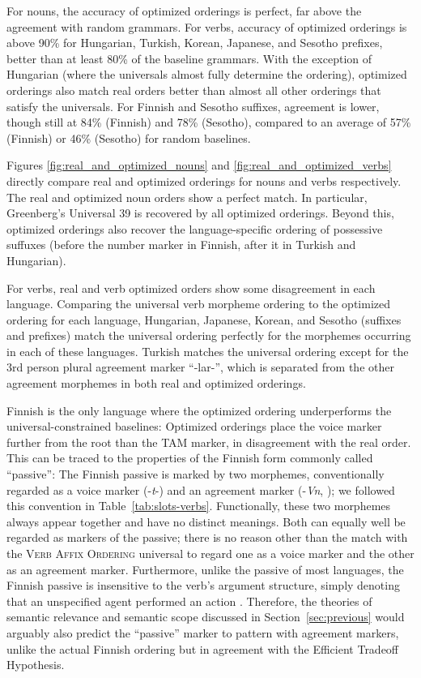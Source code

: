 \documentclass[11pt,letterpaper]{article}
\newcommand{\citep}{\parencite}
\newcommand{\citet}{\Textcite}
\begin{document}
For nouns, the accuracy of optimized orderings is perfect, far above the agreement with random grammars.
For verbs, accuracy of optimized orderings is above 90\% for Hungarian, Turkish, Korean, Japanese, and Sesotho prefixes, better than at least 80\% of the baseline grammars. 
With the exception of Hungarian (where the universals almost fully determine the ordering), optimized orderings also match real orders better than almost all other orderings that satisfy the universals.
For Finnish and Sesotho suffixes, agreement is lower, though still at 84\% (Finnish) and 78\% (Sesotho), compared to an average of 57\% (Finnish) or 46\% (Sesotho) for random baselines.

Figures \ref{fig:real_and_optimized_nouns} and \ref{fig:real_and_optimized_verbs} directly compare real and optimized orderings for nouns and verbs respectively.
The real and optimized noun orders show a perfect match.
In particular, Greenberg's Universal 39 is recovered by all optimized orderings.
Beyond this, optimized orderings also recover the language-specific ordering of possessive suffuxes (before the number marker in Finnish, after it in Turkish and Hungarian).

For verbs, real and verb optimized orders show some disagreement in each language.
Comparing the universal verb morpheme ordering to the optimized ordering for each language, Hungarian, Japanese, Korean, and Sesotho (suffixes and prefixes) match the universal ordering perfectly for the morphemes occurring in each of these languages. 
Turkish matches the universal ordering except for the 3rd person plural agreement marker ``-lar-'', which is separated from the other agreement morphemes in both real and optimized orderings.

Finnish is the only language where the optimized ordering underperforms the universal-constrained baselines: Optimized orderings place the voice marker further from the root than the TAM marker, in disagreement with the real order.
This can be traced to the properties of the Finnish form commonly called ``passive'':
The Finnish passive is marked by two morphemes, conventionally regarded as a voice marker (-\textit{t}-) and an agreement marker (-\textit{Vn}, \citet[Section 69]{karlsson1999finnish}); we followed this convention in Table~\ref{tab:slots-verbs}.
Functionally, these two morphemes always appear together and have no distinct meanings.
Both can equally well be regarded as markers of the passive; there is no reason other than the match with the \textsc{Verb Affix Ordering} universal to regard one as a voice marker and the other as an agreement marker.
Furthermore, unlike the passive of most languages, the Finnish passive is insensitive to the verb's argument structure, simply denoting that an unspecified agent performed an action \citep{Shore1988OnTS,Blevins2003PassivesAI}.
Therefore, the theories of semantic relevance and semantic scope discussed in Section~\ref{sec:previous} would arguably also predict the ``passive'' marker to pattern with agreement markers, unlike the actual Finnish ordering but in agreement with the Efficient Tradeoff Hypothesis.
\end{document}
